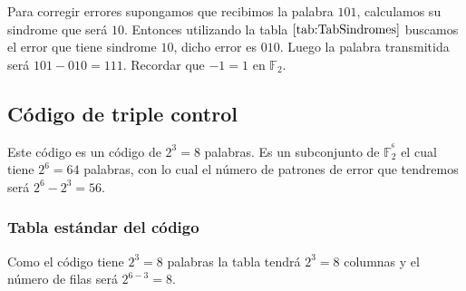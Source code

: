 Para corregir errores supongamos que recibimos la palabra $101$, calculamos
su sindrome que ser\'a $10$. Entonces utilizando la tabla
$\ref{tab:TabSindromes}$ buscamos el error que tiene sindrome $10$, dicho
error es $010$. Luego la palabra transmitida ser\'a $101-010=111$. Recordar
que $-1=1$ en $\mathbb{F}_2$.

\subsection{C\'odigo de triple control}

Este c\'odigo es un c\'odigo de $2^3=8$ palabras. Es un subconjunto de
$\mathbb{F}^{^6}_2$ el cual tiene $2^6=64$ palabras, con lo cual el n\'umero
de patrones de error que tendremos ser\'a $2^6-2^3=56$.

\subsubsection{Tabla est\'andar del c\'odigo}

Como el c\'odigo tiene $2^3=8$ palabras la tabla tendr\'a $2^3=8$ columnas y
el n\'umero de filas ser\'a $2^{6-3}=8$.\\ 

